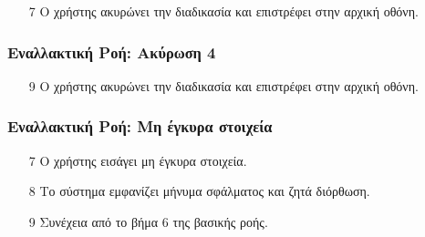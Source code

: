 \begin{enumerate}
    \item[7] Ο χρήστης ακυρώνει την διαδικασία και επιστρέφει στην αρχική οθόνη.
\end{enumerate}

\subsubsection{Εναλλακτική Ροή: Ακύρωση 4}

\begin{enumerate}
    \item[9] Ο χρήστης ακυρώνει την διαδικασία και επιστρέφει στην αρχική οθόνη.
\end{enumerate}

\subsubsection{Εναλλακτική Ροή: Μη έγκυρα στοιχεία}

\begin{enumerate}
    \item[7] Ο χρήστης εισάγει μη έγκυρα στοιχεία.
    \item[8] Το σύστημα εμφανίζει μήνυμα σφάλματος και ζητά διόρθωση.
    \item[9] Συνέχεια από το βήμα 6 της βασικής ροής.
\end{enumerate}
